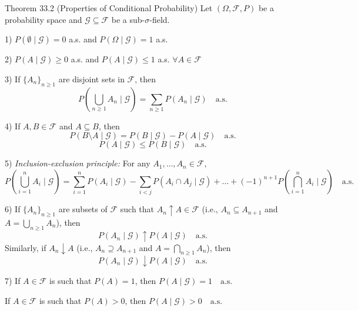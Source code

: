 \begin{theorem}{Theorem 33.2 (Properties of Conditional Probability)}
Let \((\Omega, \mathcal{F}, P)\) be a probability space and \(\mathcal{G} \subseteq \mathcal{F}\) be a sub-\(\sigma\)-field.

1) \(P(\emptyset \mid \mathcal{G}) = 0 \) a.s. and \(P(\Omega \mid \mathcal{G}) = 1 \) a.s.

2) \(P(A \mid \mathcal{G}) \geq 0\) a.s. and \(P(A \mid \mathcal{G}) \leq 1\) a.s. \(\forall A \in \mathcal{F}\)

3) If \(\{A_n\}_{n \geq 1}\) are disjoint sets in \(\mathcal{F}\), then
\[
P\left(\bigcup_{n \geq 1} A_n \mid \mathcal{G}\right) = \sum_{n \geq 1} P(A_n \mid \mathcal{G}) \quad \text{a.s.}
\]

4) If \(A, B \in \mathcal{F}\) and \(A \subseteq B\), then
\[
P(B \setminus A \mid \mathcal{G}) = P(B \mid \mathcal{G}) - P(A \mid \mathcal{G}) \quad \text{a.s.}
\]
\[
P(A \mid \mathcal{G}) \leq P(B \mid \mathcal{G}) \quad \text{a.s.}
\]

5) \textit{Inclusion-exclusion principle:} For any \(A_1, \ldots, A_n \in \mathcal{F}\),
\[
P\left(\bigcup_{i=1}^n A_i \mid \mathcal{G}\right) = \sum_{i=1}^n P(A_i \mid \mathcal{G}) - \sum_{i<j} P(A_i \cap A_j \mid \mathcal{G}) + \ldots + (-1)^{n+1} P\left(\bigcap_{i=1}^n A_i \mid \mathcal{G}\right) \quad \text{a.s.}
\]

6) If \(\{A_n\}_{n \geq 1}\) are subsets of \(\mathcal{F}\) such that \(A_n \uparrow A \in \mathcal{F}\) (i.e., \(A_n \subseteq A_{n+1}\) and \(A = \bigcup_{n \geq 1} A_n\)), then
\[
P(A_n \mid \mathcal{G}) \uparrow P(A \mid \mathcal{G}) \quad \text{a.s.}
\]
Similarly, if \(A_n \downarrow A\) (i.e., \(A_n \supseteq A_{n+1}\) and \(A = \bigcap_{n \geq 1} A_n\)), then
\[
P(A_n \mid \mathcal{G}) \downarrow P(A \mid \mathcal{G}) \quad \text{a.s.}
\]

7) If \(A \in \mathcal{F}\) is such that \(P(A) = 1\), then \(P(A \mid \mathcal{G}) = 1 \quad \text{a.s.}\)

If \(A \in \mathcal{F}\) is such that \(P(A) > 0\), then \(P(A \mid \mathcal{G}) > 0 \quad \text{a.s.}\)
\end{theorem}

